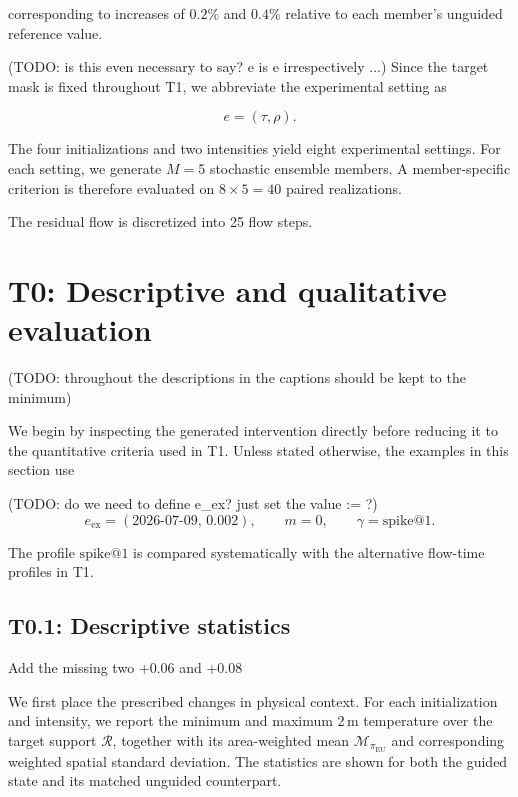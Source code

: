 corresponding to increases of $0.2\%$ and $0.4\%$ relative to each member's
unguided reference value.

(TODO: is this even necessary to say? e is e irrespectively ...)
Since the target mask is fixed throughout T1, we abbreviate the experimental
setting as

\[
    e=(\tau,\rho).
\]

The four initializations and two intensities yield eight experimental settings.
For each setting, we generate $M=5$ stochastic ensemble members. A
member-specific criterion is therefore evaluated on $8\times5=40$ paired
realizations.

The residual flow is discretized into 25 flow steps.



\section{T0: Descriptive and qualitative evaluation}
\label{sec:qualitative-evaluation}
(TODO: throughout the descriptions in the captions should be kept to the minimum)

We begin by inspecting the generated intervention directly before reducing it
to the quantitative criteria used in T1. Unless stated otherwise, the examples
in this section use

(TODO: do we need to define e\_ex? just set the value := ?)
\begin{equation}
    e_{\mathrm{ex}}
    =
    (\text{2026-07-09},\,0.002),
    \qquad
    m=0,
    \qquad
    \gamma=\mathrm{spike@1}.
    \label{eq:representative-experiment}
\end{equation}

The profile $\mathrm{spike@1}$ is compared systematically with the alternative
flow-time profiles in T1.


\subsection{T0.1: Descriptive statistics}
\label{sec:t0-descriptive-statistics}

Add the missing two +0.06 and +0.08

We first place the prescribed changes in physical context. For each
initialization and intensity, we report the minimum and maximum 2\,m
temperature over the target support $\mathcal{R}$, together with its
area-weighted mean $\mathcal{M}_{\pi_{\mathrm{EU}}}$ and corresponding
weighted spatial standard deviation. The statistics are shown for both the
guided state and its matched unguided counterpart.

